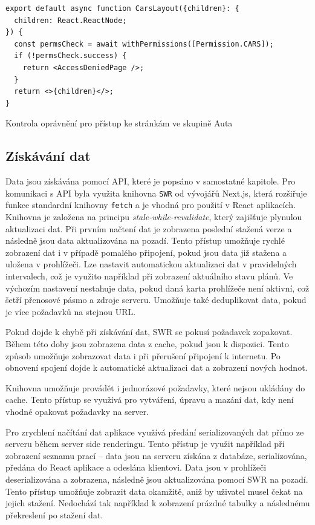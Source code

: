 \begin{listing}[h]
  \begin{verbatim}
export default async function CarsLayout({children}: {
  children: React.ReactNode;
}) {
  const permsCheck = await withPermissions([Permission.CARS]);
  if (!permsCheck.success) {
    return <AccessDeniedPage />;
  }
  return <>{children}</>;
}
    \end{verbatim}
    \caption{Kontrola oprávnění pro přístup ke stránkám ve skupině Auta}
    \label{code:cars-layout}
\end{listing}

\subsection{Získávání dat}

Data jsou získávána pomocí API, které je popsáno v samostatné kapitole. Pro komunikaci s API byla využita knihovna \texttt{SWR} od vývojářů Next.js, která
rozšiřuje funkce standardní knihovny \texttt{fetch} a je vhodná pro použití v React aplikacích. Knihovna je založena na principu \textit{stale-while-revalidate},
který zajišťuje plynulou aktualizaci dat. Při prvním načtení dat je zobrazena poslední stažená verze a následně jsou data aktualizována na pozadí. Tento přístup
umožňuje rychlé zobrazení dat i v případě pomalého připojení, pokud jsou data již stažena a uložena v prohlížeči. Lze nastavit automatickou aktualizaci dat 
v pravidelných intervalech, což je využito například při zobrazení aktuálního stavu plánů. Ve výchozím nastavení nestahuje data, pokud daná karta prohlížeče není
aktivní, což šetří přenosové pásmo a zdroje serveru. Umožňuje také deduplikovat data, pokud je více požadavků na stejnou URL.

Pokud dojde k chybě při získávání dat, SWR se pokusí požadavek zopakovat. Během této doby jsou zobrazena data z cache, pokud jsou k dispozici. Tento způsob
umožňuje zobrazovat data i při přerušení připojení k internetu. Po obnovení spojení dojde k automatické aktualizaci dat a zobrazení nových hodnot.

Knihovna umožňuje provádět i jednorázové požadavky, které nejsou ukládány do cache. Tento přístup se využívá pro vytváření, úpravu a mazání dat, kdy není vhodné
opakovat požadavky na server.

Pro zrychlení načítání dat aplikace využívá předání serializovaných dat přímo ze serveru během server side renderingu. Tento přístup je využit například při
zobrazení seznamu prací -- data jsou na serveru získána z databáze, serializována, předána do React aplikace a odeslána klientovi.
Data jsou v prohlížeči deserializována a zobrazena, následně jsou aktualizována pomocí SWR na pozadí. Tento přístup umožňuje zobrazit data okamžitě, aniž by
uživatel musel čekat na jejich stažení. Nedochází tak například k zobrazení prázdné tabulky a následnému překreslení po stažení dat.

